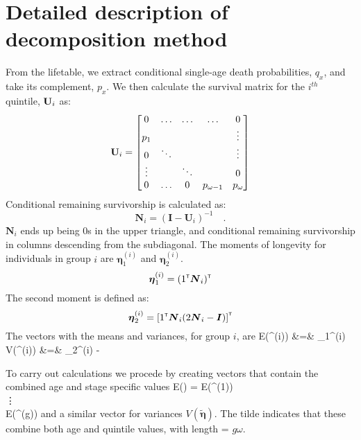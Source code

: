 \documentclass[12pt,oneside,a4paper]{article} %
\theoremstyle{definition}
\begin{document}
\section{Detailed description of decomposition method}

From the lifetable, we extract
conditional single-age death probabilities, $q_x$, and take its complement,
$p_x$. We then calculate the survival matrix for the $i^{th}$
quintile, ${\bf U}_i$ as:
\begin{equation}
{\bf U}_i = 
\begin{bmatrix}
    0     & \hdots  & \hdots &  \hdots  & 0 \\
    p_{1} &   &    &    &  \vdots \\
    0 & \ddots &   &   & \vdots \\
    \vdots & & \ddots & & 0\\
   0 &  \hdots & 0 & p_{\omega-1}  & p_{\omega}
\end{bmatrix}
\end{equation}
Conditional remaining survivorship is calculated as:
\begin{equation}
\mathbf{N}_i = (\mathbf{I} - \mathbf{U}_i )^{-1} \quad .
\end{equation}
$\mathbf{N}_i$ ends up being 0s in the upper triangle, and conditional remaining
survivorship in columns descending from the subdiagonal. The moments of longevity for individuals in group $i$ are $\bm \eta_1^{(i)}$ and $\bm \eta_2^{(i)}$. 
\begin{equation}
\mbox{\boldmath $\eta$}_1^{(i)} = (1^{\mbox{\tiny \sf T}} \mbox{\boldmath $N$}_i)^{\mbox{\tiny \sf T}}
\end{equation}
The second moment is defined as:
\begin{equation}
\mbox{\boldmath $\eta$}_2^{(i)} = \left[ 1^{\mbox{\tiny \sf T}} \mbox{\boldmath $N$}_i (2 \mbox{\boldmath $N$}_i - \mbox{\boldmath $I$})\right]^{\mbox{\tiny \sf T}}
\end{equation}
The vectors with the means and variances, for group $i$, are
\bea
E(\bm \eta^{(i)}) &=& \bm \eta_1^{(i)} \\
V(\bm \eta^{(i)}) &=& \bm \eta_2^{(i)} - 
\eea

To carry out calculations we procede by creating vectors that contain the
combined age and stage specific values
\bea
E(\tilde{\bm \eta}) = 
E(\bm \eta^{(1)}) \\
\vdots\\
E(\bm \eta^{(g)})
\emat
\eea
and a similar vector for variances $V(\tilde{\bm \eta})$. The tilde indicates
that these combine both age and quintile values, with length = $g \omega$.
\end{document}
